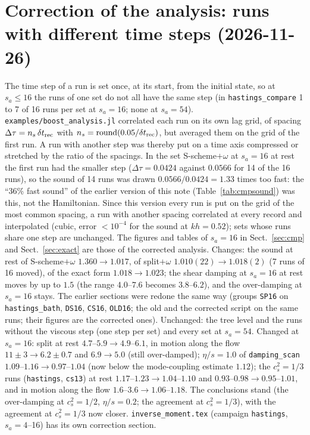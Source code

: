 \documentclass[11pt,aps,preprint,nofootinbib,superscriptaddress,tightenlines]{revtex4-2}
\def\Sect#1{Sect.~\ref{#1}}
\begin{document}
\section{Correction of the analysis: runs with different time steps (2026-11-26)}
\label{sec:lagfix}

The time step of a run is set once, at its start, from the initial state, so at $s_a\le16$ the runs of one set do not all have the same step (in
\texttt{hastings\_compare} 1 to 7 of 16 runs per set at $s_a=16$; none at $s_a=54$).  \nolinkurl{examples/boost_analysis.jl} correlated each run on its
own lag grid, of spacing $\Delta\tau=n_s\,\delta t_{\rm rec}$ with $n_s={\rm round}(0.05/\delta t_{\rm rec})$, but averaged them on the grid of the first
run.  A run with another step was thereby put on a time axis compressed or stretched by the ratio of the spacings.  In the set S-scheme$+\omega$ at
$s_a=16$ at rest the first run had the smaller step ($\Delta\tau=0.0424$ against $0.0566$ for 14 of the 16 runs), so the sound of 14 runs was drawn
$0.0566/0.0424=1.33$ times too fast: the ``36\% fast sound'' of the earlier version of this note (Table~\ref{tab:cmpsound}) was this, not the
Hamiltonian.  Since this version every run is put on the grid of the most common spacing, a run with another spacing correlated at every record and
interpolated (cubic, error $<10^{-4}$ for the sound at $kh=0.52$); sets whose runs share one step are unchanged.  The figures and tables of $s_a=16$ in
\Sect{sec:cmp} and \Sect{sec:exact} are those of the corrected analysis.  Changes: the sound at rest of S-scheme$+\omega$ $1.360\to1.017$, of
split$+\omega$ $1.010(22)\to1.018(2)$ (7 runs of 16 moved), of the exact form $1.018\to1.023$; the shear damping at $s_a=16$ at rest moves by up to
$1.5$ (the range $4.0$--$7.6$ becomes $3.8$--$6.2$), and the over-damping at $s_a=16$ stays.  The earlier sections were redone the same way (groups \texttt{SP16} on \texttt{hastings\_bath}, \texttt{DS16}, \texttt{CS16}, \texttt{OLD16}; the old
and the corrected script on the same runs; their figures are the corrected ones).  Unchanged: the tree level and the runs without the viscous step
(one step per set) and every set at $s_a=54$.  Changed at $s_a=16$: split at rest $4.7$--$5.9\to4.9$--$6.1$, in motion along the flow $11\pm3\to6.2\pm0.7$
and $6.9\to5.0$ (still over-damped); $\eta/s=1.0$ of \texttt{damping\_scan} $1.09$--$1.16\to0.97$--$1.04$ (now below the mode-coupling estimate $1.12$);
the $c_s^2=1/3$ runs (\texttt{hastings}, \texttt{cs13}) at rest $1.17$--$1.23\to1.04$--$1.10$ and $0.93$--$0.98\to0.95$--$1.01$, and in motion along the flow
$1.6$--$3.6\to1.06$--$1.18$.  The conclusions stand (the over-damping at $c_s^2=1/2$, $\eta/s=0.2$; the agreement at $c_s^2=1/3$), with the agreement at
$c_s^2=1/3$ now closer.  \nolinkurl{inverse_moment.tex} (campaign \texttt{hastings}, $s_a=4$--16) has its own correction section.
\end{document}
